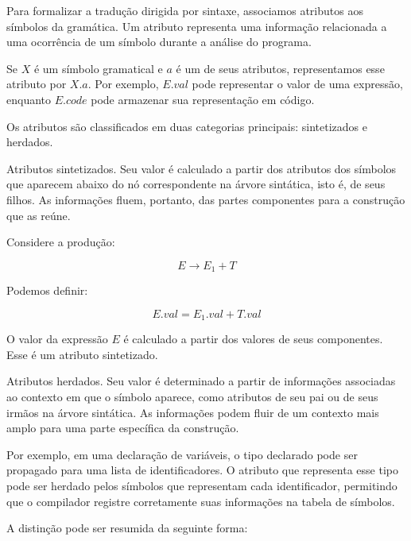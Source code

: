\documentclass[
  brazilian,
  letterpaper,
]{book}
\theoremstyle{plain}
\theoremstyle{definition}
\theoremstyle{remark}
\begin{document}
Para formalizar a tradução dirigida por sintaxe, associamos atributos
aos símbolos da gramática. Um atributo representa uma informação
relacionada a uma ocorrência de um símbolo durante a análise do
programa.

Se \(X\) é um símbolo gramatical e \(a\) é um de seus atributos,
representamos esse atributo por \(X.a\). Por exemplo, \(E.val\) pode
representar o valor de uma expressão, enquanto \(E.code\) pode armazenar
sua representação em código.

Os atributos são classificados em duas categorias principais:
sintetizados e herdados.

Atributos sintetizados. Seu valor é calculado a partir dos atributos dos
símbolos que aparecem abaixo do nó correspondente na árvore sintática,
isto é, de seus filhos. As informações fluem, portanto, das partes
componentes para a construção que as reúne.

Considere a produção:

\[ E \rightarrow E_1 + T \]

Podemos definir:

\[ E.val = E_1.val + T.val \]

O valor da expressão \(E\) é calculado a partir dos valores de seus
componentes. Esse é um atributo sintetizado.

Atributos herdados. Seu valor é determinado a partir de informações
associadas ao contexto em que o símbolo aparece, como atributos de seu
pai ou de seus irmãos na árvore sintática. As informações podem fluir de
um contexto mais amplo para uma parte específica da construção.

Por exemplo, em uma declaração de variáveis, o tipo declarado pode ser
propagado para uma lista de identificadores. O atributo que representa
esse tipo pode ser herdado pelos símbolos que representam cada
identificador, permitindo que o compilador registre corretamente suas
informações na tabela de símbolos.

A distinção pode ser resumida da seguinte forma:
\end{document}
